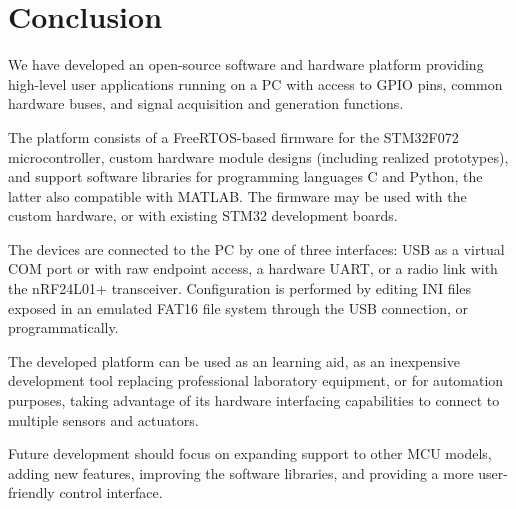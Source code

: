 \chapter{Conclusion}

We have developed an open-source software and hardware platform providing high-level user applications running on a \gls{PC} with access to \gls{GPIO} pins, common hardware buses, and signal acquisition and generation functions.

The platform consists of a FreeRTOS-based firmware for the STM32F072 microcontroller, custom hardware module designs (including realized prototypes), and support software libraries for programming languages C and Python, the latter also compatible with MATLAB. The firmware may be used with the custom hardware, or with existing STM32 development boards.

The devices are connected to the \gls{PC} by one of three interfaces: \gls{USB} as a virtual COM port or with raw endpoint access, a hardware \gls{UART}, or a radio link with the nRF24L01+ transceiver. Configuration is performed by editing INI files exposed in an emulated FAT16 file system through the \gls{USB} connection, or programmatically.

The developed platform can be used as an learning aid, as an inexpensive development tool replacing professional laboratory equipment, or for automation purposes, taking advantage of its hardware interfacing capabilities to connect to multiple sensors and actuators.

Future development should focus on expanding support to other \gls{MCU} models, adding new features, improving the software libraries, and providing a more user-friendly control interface.
